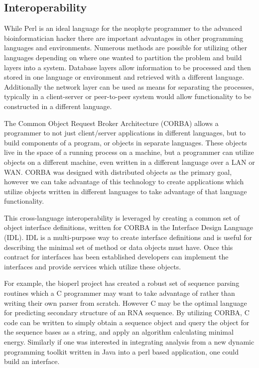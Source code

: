 \documentclass{article}
\begin{document}
\begin{twocolumn}
\section{Interoperability}


While Perl is an ideal language for the neophyte programmer to the
advanced bioinformatician hacker there are important advantages in
other programming languages and environments.  Numerous methods are
possible for utilizing other languages depending on where one wanted
to partition the problem and build layers into a system.  Database
layers allow information to be processed and then
stored in one language or environment and retrieved with a different
language.  Additionally the network layer can be used as means for
separating the processes, typically in a client-server or peer-to-peer
system would allow functionality to be constructed in a different
language.

The Common Object Request Broker Architecture (CORBA) allows a
programmer to not just client/server applications in different
languages, but to build components of a program, or objects in
separate languages.  These objects live in the space of a running
process on a machine, but a programmer can utilize objects on a
different machine, even written in a different language over a LAN or
WAN.  CORBA was designed with distributed objects as the primary goal,
however we can take advantage of this technology to create
applications which utilize objects written in different languages to
take advantage of that language functionality.

This cross-language interoperability is leveraged by creating a common
set of object interface definitions, written for CORBA in the
Interface Design Language (IDL).  IDL is a multi-purpose way to create
interface definitions and is useful for describing the minimal set of
method or data objects must have.  Once this contract for interfaces
has been established developers can implement the interfaces and
provide services which utilize these objects. 

For example, the bioperl project has created a robust set of sequence
parsing routines which a C programmer may want to take advantage of
rather than writing their own parser from scratch.  However C may be
the optimal language for predicting secondary structure of an RNA
sequence.  By utilizing CORBA, C code can be written to simply obtain
a sequence object and query the object for the sequence bases as a
string, and apply an algorithm calculating minimal energy.  Similarly
if one was interested in integrating analysis from a new dynamic
programming toolkit written in Java into a perl based application, one
could build an interface.


\end{twocolumn}
\end{document}
